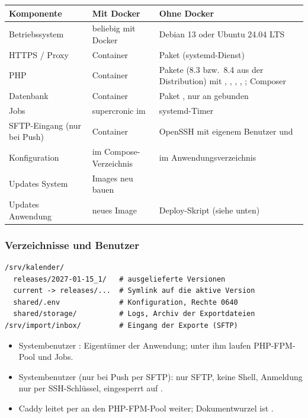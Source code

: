 \begin{center}
\begin{tabularx}{\textwidth}{L{3.2cm}L{4.4cm}X}
\toprule
\textbf{Komponente} & \textbf{Mit Docker} & \textbf{Ohne Docker} \\
\midrule
Betriebssystem & beliebig mit Docker & Debian 13 oder Ubuntu 24.04 LTS \\
HTTPS / Proxy & Container  & Paket  (systemd-Dienst) \\
PHP & Container  & Pakete  (8.3 bzw.\ 8.4 aus der
  Distribution) mit , , ,
  , ; Composer \\
Datenbank & Container  & Paket , nur an
   gebunden \\
Jobs & supercronic im  & systemd-Timer \\
SFTP-Eingang (nur bei Push) & Container  & OpenSSH mit eigenem
  Benutzer und  \\
Konfiguration &  im Compose-Verzeichnis &  im
  Anwendungsverzeichnis \\
Updates System & Images neu bauen &  \\
Updates Anwendung & neues Image & Deploy-Skript (siehe unten) \\
\bottomrule
\end{tabularx}
\end{center}

\subsubsection*{Verzeichnisse und Benutzer}

\begin{lstlisting}
/srv/kalender/
  releases/2027-01-15_1/   # ausgelieferte Versionen
  current -> releases/...  # Symlink auf die aktive Version
  shared/.env              # Konfiguration, Rechte 0640
  shared/storage/          # Logs, Archiv der Exportdateien
/srv/import/inbox/         # Eingang der Exporte (SFTP)
\end{lstlisting}

\begin{itemize}
  \item Systembenutzer : Eigentümer der Anwendung; unter ihm
        laufen PHP-FPM-Pool und Jobs.
  \item Systembenutzer  (nur bei Push per SFTP): nur SFTP, keine Shell, Anmeldung
        nur per SSH-Schlüssel, eingesperrt auf .
  \item Caddy leitet  per  an
        den PHP-FPM-Pool weiter; Dokumentwurzel ist
        .
\end{itemize}

